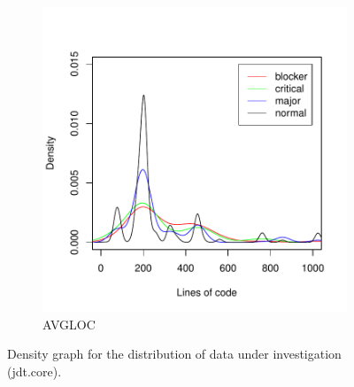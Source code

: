 \begin{figure}
        \begin{subfigure}[b]{0.5\textwidth}
                \centering
                \includegraphics[width=\textwidth]{img/sev-core-avgloc-density.pdf}
                \caption{AVGLOC}
                \label{fig:density-sevcore-avgloc}
        \end{subfigure}
        \caption{Density graph for the distribution of data under investigation (jdt.core).}
        \label{fig:packages-density-sevcore}
\end{figure}

